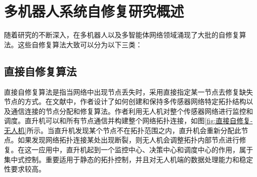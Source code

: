 \section{多机器人系统自修复研究概述}
随着研究的不断深入，在多机器人以及多智能体网络领域涌现了大批的自修复算法。这些自修复算法大致可以分为以下三类\supercite{张飞2010}：

\subsection{直接自修复算法}
直接自修复算法是指当网络中出现节点丢失时，采用直接指定某一节点去修复缺失节点的方式。在文献\parencite{corke2004autonomous}中，作者设计了如何创建和保持多传感器网络特定拓扑结构以及通信连接的节点分配和修复算法。作者利用无人机对整个传感器网络进行监控和调度。直升机可以和所有节点通信并构建整个网络拓扑连接，如图\ref{fig:直接自修复-无人机}所示。当直升机发现某个节点不在拓扑范围之内，直升机会重新分配此节点。如果发现网络拓扑连接某处出现断裂，则无人机会调整拓扑内部节点进行修复。在这一应用中，直升机起到一个监控中心、决策中心和调度中心的作用，属于集中式控制。重要适用于静态的拓扑控制，并且对无人机端的数据处理能力和稳定性要求较高。

\begin{figure*}[!htbp]
	\begin{multicols}{2}
		
		\begin{center}
		\end{center}
		\begin{center}
		\end{center}
		\begin{center}
		\end{center}
	\end{multicols}
\end{figure*}

